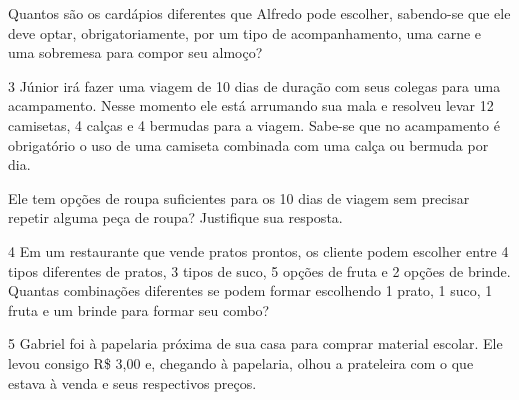 Quantos são os cardápios diferentes que Alfredo pode escolher, sabendo-se
que ele deve optar, obrigatoriamente, por um tipo de acompanhamento, uma
carne e uma sobremesa para compor seu almoço?



\num{3} Júnior irá fazer uma viagem de 10 dias de duração com seus colegas
para uma acampamento. Nesse momento ele está arrumando sua mala e
resolveu levar 12 camisetas, 4 calças e 4 bermudas para a viagem.
Sabe-se que no acampamento é obrigatório o uso de uma camiseta combinada
com uma calça ou bermuda por dia.

Ele tem opções de roupa suficientes para os 10 dias de viagem sem
precisar repetir alguma peça de roupa? Justifique sua resposta.



\num{4} Em um restaurante que vende pratos prontos, os cliente podem escolher entre 4 tipos diferentes de pratos, 3 tipos de suco, 5 opções de fruta e 2 opções de brinde. Quantas combinações diferentes se podem formar escolhendo 1 prato, 1 suco, 1 fruta e um brinde para
formar seu combo?



\num{5} Gabriel foi à papelaria próxima de sua casa para comprar material
escolar. Ele levou consigo R\$ 3,00 e, chegando à papelaria, olhou a
prateleira com o que estava à venda e seus respectivos preços.


